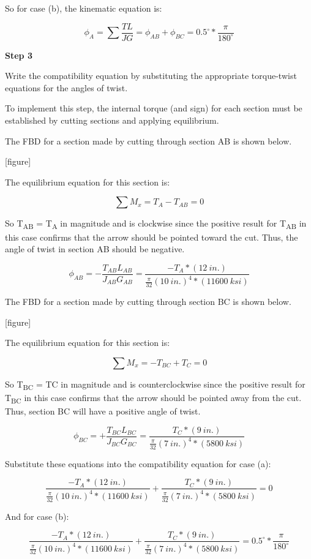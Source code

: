 \documentclass[
  letterpaper,
  DIV=11,
  numbers=noendperiod]{scrreprt}
\theoremstyle{definition}
\theoremstyle{remark}
\begin{document}
\begin{tcolorbox}
\begin{tcolorbox}
So for case (b), the kinematic equation is:

\[
\phi_A=\sum \frac{TL}{JG}=\phi_{A B}+\phi_{BC}=0.5^{\circ} * \frac{\pi}{180^{\circ}}
\]

\textbf{Step 3}

Write the compatibility equation by substituting the appropriate
torque-twist equations for the angles of twist.

To implement this step, the internal torque (and sign) for each section
must be established by cutting sections and applying equilibrium.

The FBD for a section made by cutting through section AB is shown below.

{[}figure{]}

The equilibrium equation for this section is:

\[
\sum M_x=T_A-T_{A B}=0
\]

So T\textsubscript{AB} = T\textsubscript{A} in magnitude and is
clockwise since the positive result for T\textsubscript{AB} in this case
confirms that the arrow should be pointed toward the cut. Thus, the
angle of twist in section AB should be negative.

\[
\phi_{AB}=-\frac{T_{AB}L_{AB}}{J_{AB}G_{AB}}=\frac{-T_A*(12{~in.})}{\frac{\pi}{32}(10{~in.})^4*(11600{~ksi})}
\]

The FBD for a section made by cutting through section BC is shown below.

{[}figure{]}

The equilibrium equation for this section is:

\[
\sum M_x=-T_{B C}+T_C=0
\]

So T\textsubscript{BC} = TC in magnitude and is counterclockwise since
the positive result for T\textsubscript{BC} in this case confirms that
the arrow should be pointed away from the cut. Thus, section BC will
have a positive angle of twist.

\[
\phi_{B C}=+\frac{T_{BC}L_{BC}}{J_{BC}G_{BC}}=\frac{T_C*(9{~in.})}{\frac{\pi}{32}(7{~in.})^4*(5800{~ksi})}
\]

Substitute these equations into the compatibility equation for case (a):

\[
\frac{-T_A*(12{~in.})}{\frac{\pi}{32}(10{~in.})^4*(11600{~ksi})}+\frac{T_C*(9 {~in.})}{\frac{\pi}{32}(7{~in.})^4*(5800{~ksi})}=0
\]

And for case (b):

\[
\frac{-T_A*(12{~in.})}{\frac{\pi}{32}(10{~in.})^4*(11600{~ksi})}+\frac{T_C*(9 {~in.})}{\frac{\pi}{32}(7{~in.})^4*(5800{~ksi})}=0.5^{\circ}*\frac{\pi}{180^{\circ}}
\]


\end{tcolorbox}
\end{tcolorbox}
\end{document}
